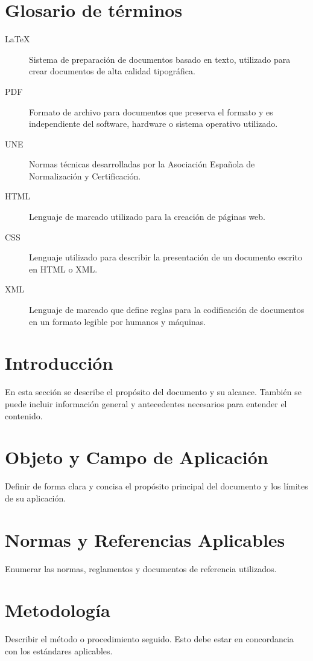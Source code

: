 \documentclass[a4paper,12pt]{article}
\begin{document}
\begin{Form}
\tableofcontents

\section*{Glosario de términos}

\begin{description}
  \item[LaTeX] Sistema de preparación de documentos basado en texto, utilizado para crear documentos de alta calidad tipográfica.
  \item[PDF] Formato de archivo para documentos que preserva el formato y es independiente del software, hardware o sistema operativo utilizado.
  \item[UNE] Normas técnicas desarrolladas por la Asociación Española de Normalización y Certificación.
  \item[HTML] Lenguaje de marcado utilizado para la creación de páginas web.
  \item[CSS] Lenguaje utilizado para describir la presentación de un documento escrito en HTML o XML.
  \item[XML] Lenguaje de marcado que define reglas para la codificación de documentos en un formato legible por humanos y máquinas.
\end{description}


\newpage

\section{Introducción}
En esta sección se describe el propósito del documento y su alcance. También se puede incluir información general y antecedentes necesarios para entender el contenido.

\section{Objeto y Campo de Aplicación}
Definir de forma clara y concisa el propósito principal del documento y los límites de su aplicación.

\section{Normas y Referencias Aplicables}
Enumerar las normas, reglamentos y documentos de referencia utilizados.


\section{Metodología}
Describir el método o procedimiento seguido. Esto debe estar en concordancia con los estándares aplicables.


\end{Form}
\end{document}
